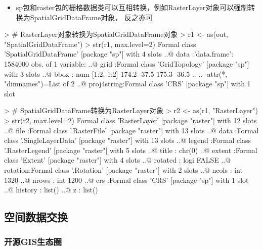 \begin{frame}[t,fragile]{\subsecname}{\subsubsecname}
\begin{itemize}
\item<1-> sp包和raster包的栅格数据类可以互相转换，例如RasterLayer对象可以强制转换为SpatialGridDataFrame对象，
反之亦可
\end{itemize}

\begin{rcode}
> # RasterLayer对象转换为SpatialGridDataFrame对象
> r1 <- as(out, "SpatialGridDataFrame")
> str(r1, max.level=2)
Formal class 'SpatialGridDataFrame' [package "sp"] with 4 slots
  ..@ data       :'data.frame': 1584000 obs. of  1 variable:
  ..@ grid       :Formal class 'GridTopology' [package "sp"] with 3 slots
  ..@ bbox       : num [1:2, 1:2] 174.2 -37.5 175.3 -36.5
  .. ..- attr(*, "dimnames")=List of 2
  ..@ proj4string:Formal class 'CRS' [package "sp"] with 1 slot

> # SpatialGridDataFrame转换为RasterLayer对象
> r2 <- as(r1, "RasterLayer")
> str(r2, max.level=2)
Formal class 'RasterLayer' [package "raster"] with 12 slots
  ..@ file    :Formal class '.RasterFile' [package "raster"] with 13 slots
  ..@ data    :Formal class '.SingleLayerData' [package "raster"] with 13 slots
  ..@ legend  :Formal class '.RasterLegend' [package "raster"] with 5 slots
  ..@ title   : chr(0) 
  ..@ extent  :Formal class 'Extent' [package "raster"] with 4 slots
  ..@ rotated : logi FALSE
  ..@ rotation:Formal class '.Rotation' [package "raster"] with 2 slots
  ..@ ncols   : int 1320
  ..@ nrows   : int 1200
  ..@ crs     :Formal class 'CRS' [package "sp"] with 1 slot
  ..@ history : list()
  ..@ z       : list()
\end{rcode}
\end{frame}

\subsection{空间数据交换}
\subsubsection{开源GIS生态圈}

